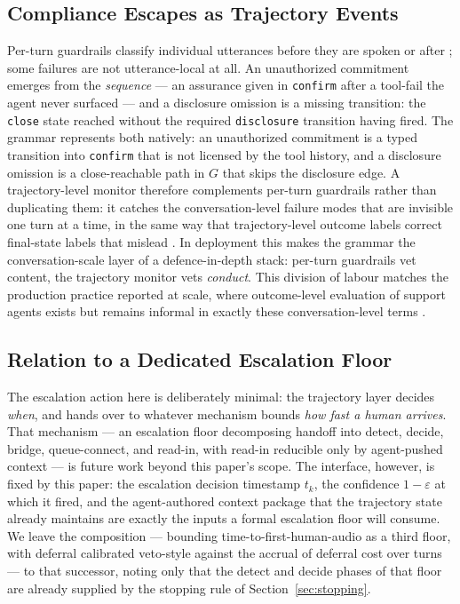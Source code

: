 \subsection{Compliance Escapes as Trajectory Events}
Per-turn guardrails classify individual utterances before they are spoken or after
\citep{rebedea2023nemo,dong2024building}; some failures are not utterance-local at all.
An unauthorized commitment emerges from the \emph{sequence} --- an assurance given in
\texttt{confirm} after a tool-fail the agent never surfaced --- and a disclosure omission is
a missing transition: the \texttt{close} state reached without the required
\texttt{disclosure} transition having fired.
The grammar represents both natively: an unauthorized commitment is a typed transition into
\texttt{confirm} that is not licensed by the tool history, and a disclosure omission is a
close-reachable path in $G$ that skips the disclosure edge.
A trajectory-level monitor therefore complements per-turn guardrails rather than duplicating
them: it catches the conversation-level failure modes that are invisible one turn at a time,
in the same way that trajectory-level outcome labels correct final-state labels that mislead
\citep{falsesuccess2026}.
In deployment this makes the grammar the conversation-scale layer of a defence-in-depth stack:
per-turn guardrails vet content, the trajectory monitor vets \emph{conduct}.
This division of labour matches the production practice reported at scale, where outcome-level
evaluation of support agents exists but remains informal in exactly these conversation-level
terms \citep{nubank2026}.

\subsection{Relation to a Dedicated Escalation Floor}
The escalation action here is deliberately minimal: the trajectory layer decides \emph{when},
and hands over to whatever mechanism bounds \emph{how fast a human arrives}.
That mechanism --- an escalation floor decomposing handoff into detect, decide, bridge,
queue-connect, and read-in, with read-in reducible only by agent-pushed context --- is future
work beyond this paper's scope.
The interface, however, is fixed by this paper: the escalation decision timestamp $t_k$, the
confidence $1-\varepsilon$ at which it fired, and the agent-authored context package that the
trajectory state already maintains are exactly the inputs a formal escalation floor will
consume.
We leave the composition --- bounding time-to-first-human-audio as a third floor, with
deferral calibrated veto-style against the accrual of deferral cost over turns --- to that
successor, noting only that the detect and decide phases of that floor are already supplied
by the stopping rule of Section~\ref{sec:stopping}.
